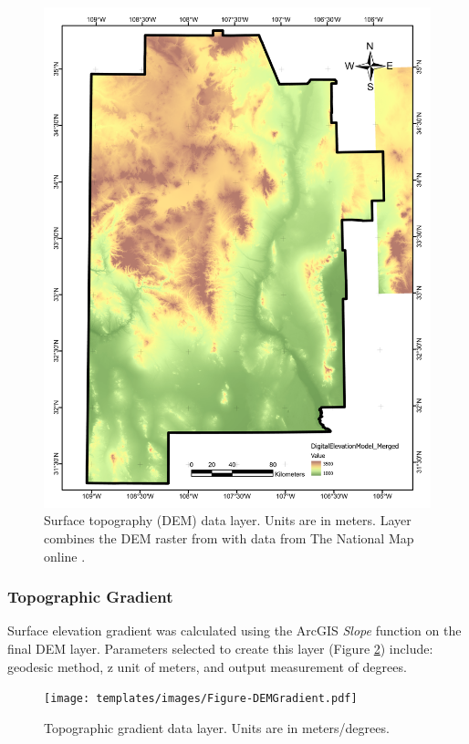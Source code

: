 \begin{figure}[!htp]
\centering
\includegraphics[scale=.50]{templates/images/Figure-DEM.pdf}
\caption[Surface topography (DEM) data layer]{Surface topography (DEM) data layer. Units are in meters. Layer combines the DEM raster from \citep{bielicki_hydrogeolgic_2015} with data from The National Map online \citep{usgs_tnm_2021}.}
\label{fig:feat_dem}
\end{figure}

\subsubsection{Topographic Gradient}

Surface elevation gradient was calculated using the ArcGIS \textit{Slope} function on the final DEM layer. Parameters selected to create this layer (Figure \ref{fig:feat_dem_gradient}) include: geodesic method, z unit of meters, and output measurement of degrees.

\begin{figure}[!htp]
\centering
\texttt{[image: templates/images/Figure-DEMGradient.pdf]}
\caption[Topographic gradient data layer]{Topographic gradient data layer. Units are in meters/degrees.}
\label{fig:feat_dem_gradient}
\end{figure}

